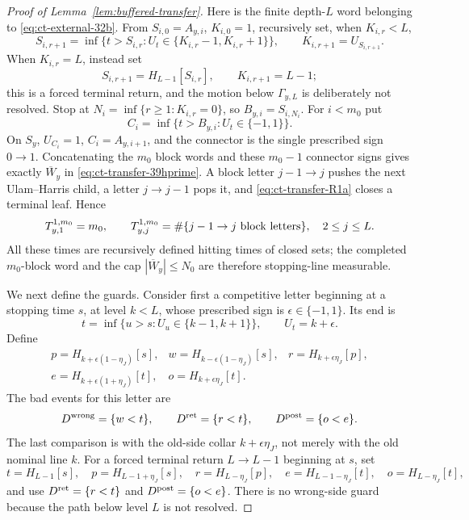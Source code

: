 \begin{proof}[Proof of Lemma~\ref{lem:buffered-transfer}]
Here is the finite depth-$L$ word belonging to \eqref{eq:ct-external-32b}.  From
$S_{i,0}=A_{y,i}$, $K_{i,0}=1$, recursively set, when $K_{i,r}<L$,
\[
S_{i,r+1}=\inf\{t>S_{i,r}:U_t\in
             \{K_{i,r}-1,K_{i,r}+1\}\},\qquad
 K_{i,r+1}=U_{S_{i,r+1}}.
\]
When $K_{i,r}=L$, instead set
\begin{equation}
S_{i,r+1}=H_{L-1}[S_{i,r}],\qquad K_{i,r+1}=L-1;\label{eq:ct-transfer-R1a}
\end{equation}
this is a forced terminal return, and the motion below $\Gamma_{y,L}$
is deliberately not resolved.  Stop at
$N_i=\inf\{r\ge1:K_{i,r}=0\}$, so $B_{y,i}=S_{i,N_i}$.
For $i<m_0$ put
\[
C_i=\inf\{t>B_{y,i}:U_t\in\{-1,1\}\}.
\]
On $S_y$, $U_{C_i}=1$, $C_i=A_{y,i+1}$, and the connector is the
single prescribed sign $0\to1$.  Concatenating the $m_0$ block words
and these $m_0-1$ connector signs gives exactly $\overline W_y$ in
\eqref{eq:ct-transfer-39hprime}.  A block letter $j-1\to j$ pushes the next Ulam--Harris child,
a letter $j\to j-1$ pops it, and \eqref{eq:ct-transfer-R1a} closes a terminal leaf.  Hence
\begin{equation}
T_{y,1}^{1,m_0}=m_0,\qquad
 T_{y,j}^{1,m_0}=\#\{j-1\to j\hbox{ block letters}\},
                  \quad2\le j\le L.\label{eq:ct-transfer-R1b}
\end{equation}
All these times are recursively defined hitting times of closed sets;
the completed $m_0$-block word and the cap $|\overline W_y|\le N_0$
are therefore stopping-line measurable.

We next define the guards.  Consider first a competitive letter beginning
at a stopping time $s$, at level $k<L$, whose prescribed sign is
$\epsilon\in\{-1,1\}$.  Its end is
\[
t=\inf\{u>s:U_u\in\{k-1,k+1\}\},\qquad U_t=k+\epsilon.
\]
Define
\[
\begin{array}{lll}
 p=H_{k+\epsilon(1-\eta_J)}[s],
 &w=H_{k-\epsilon(1-\eta_J)}[s],
 &r=H_{k+\epsilon\eta_J}[p],\\
 e=H_{k+\epsilon(1+\eta_J)}[t],
 &o=H_{k+\epsilon\eta_J}[t].
\end{array}
\]
The bad events for this letter are
\begin{equation}
D^{\rm wrong}=\{w<t\},\qquad
 D^{\rm ret}=\{r<t\},\qquad
 D^{\rm post}=\{o<e\}.\label{eq:ct-transfer-R2}
\end{equation}
The last comparison is with the old-side collar
$k+\epsilon\eta_J$, not merely with the old nominal line $k$.
For a forced terminal return $L\to L-1$ beginning at $s$, set
\[
t=H_{L-1}[s],\quad p=H_{L-1+\eta_J}[s],\quad
 r=H_{L-\eta_J}[p],\quad
 e=H_{L-1-\eta_J}[t],\quad o=H_{L-\eta_J}[t],
\]
and use $D^{\rm ret}=\{r<t\}$ and
$D^{\rm post}=\{o<e\}$.  There is no wrong-side guard because the
path below level $L$ is not resolved.


\end{proof}
